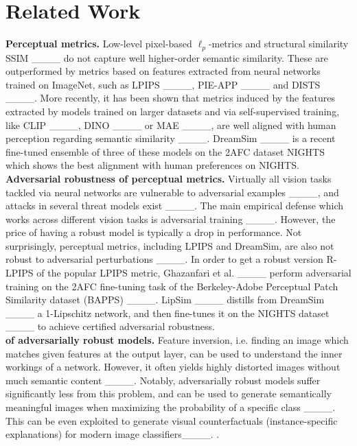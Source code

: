 \section{Related Work}
\label{sec:related}

\textbf{Perceptual metrics.}
Low-level pixel-based $\ell_p$-metrics and structural similarity SSIM ____ do not capture well higher-order semantic similarity.
These are outperformed by metrics based on features extracted from neural networks trained on ImageNet, such as
LPIPS ____, 
PIE-APP ____ and DISTS ____. 
More recently, it has been shown that metrics induced by the features extracted by models trained on larger datasets and via self-supervised training, like CLIP ____, DINO ____ or MAE ____, are well aligned with human perception regarding semantic similarity ____. 
DreamSim ____ is a recent fine-tuned ensemble of three of these models on the 2AFC dataset NIGHTS which shows the best alignment with human preferences on NIGHTS.
\\

\textbf{Adversarial robustness of perceptual metrics.}
Virtually all vision tasks tackled via neural networks are vulnerable to adversarial examples ____, 
and attacks in several threat models exist ____.
The main empirical defense which works across different vision tasks is adversarial training ____. However, the price of having a robust model is typically a drop in performance.
Not surprisingly, perceptual metrics, including LPIPS and DreamSim, are also not robust to adversarial perturbations ____.
In order to get a robust version R-LPIPS of the popular LPIPS metric, Ghazanfari et al. ____ perform adversarial training on the 2AFC 
fine-tuning task of the Berkeley-Adobe Perceptual Patch Similarity dataset (BAPPS) ____.
LipSim ____ distills from DreamSim ____ a 1-Lipschitz network, and then fine-tunes it on the NIGHTS dataset ____
to achieve certified adversarial robustness.
\\

\textbf{
 of adversarially robust models.}
Feature inversion, i.e. finding an image which matches given features at the output layer, can be used to understand the inner workings of a network. However, it often yields highly distorted images without much semantic content ____.
Notably, adversarially robust models suffer significantly less from this problem,
and can be used to generate semantically meaningful images when maximizing the probability of a specific class ____.
This 
can be even exploited to generate visual counterfactuals (instance-specific explanations) for modern image classifiers____.
.
